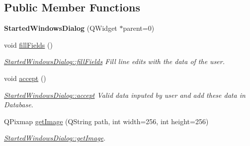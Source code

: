 \subsection*{Public Member Functions}
\begin{DoxyCompactItemize}
\item 
\hypertarget{classGui_1_1Dialogs_1_1StartedWindowsDialog_a978449729fbfc503919f29d1d2c7b4f6}{{\bfseries Started\-Windows\-Dialog} (Q\-Widget $\ast$parent=0)}\label{classGui_1_1Dialogs_1_1StartedWindowsDialog_a978449729fbfc503919f29d1d2c7b4f6}

\item 
\hypertarget{classGui_1_1Dialogs_1_1StartedWindowsDialog_a30d97171779c86ecc497ef6990829fca}{void \hyperlink{classGui_1_1Dialogs_1_1StartedWindowsDialog_a30d97171779c86ecc497ef6990829fca}{fill\-Fields} ()}\label{classGui_1_1Dialogs_1_1StartedWindowsDialog_a30d97171779c86ecc497ef6990829fca}

\begin{DoxyCompactList}\small\item\em \hyperlink{classGui_1_1Dialogs_1_1StartedWindowsDialog_a30d97171779c86ecc497ef6990829fca}{Started\-Windows\-Dialog\-::fill\-Fields} Fill line edits with the data of the user. \end{DoxyCompactList}\item 
\hypertarget{classGui_1_1Dialogs_1_1StartedWindowsDialog_aa5da70f656530017906b5aa974fbc080}{void \hyperlink{classGui_1_1Dialogs_1_1StartedWindowsDialog_aa5da70f656530017906b5aa974fbc080}{accept} ()}\label{classGui_1_1Dialogs_1_1StartedWindowsDialog_aa5da70f656530017906b5aa974fbc080}

\begin{DoxyCompactList}\small\item\em \hyperlink{classGui_1_1Dialogs_1_1StartedWindowsDialog_aa5da70f656530017906b5aa974fbc080}{Started\-Windows\-Dialog\-::accept} Valid data inputed by user and add these data in Database. \end{DoxyCompactList}\item 
Q\-Pixmap \hyperlink{classGui_1_1Dialogs_1_1StartedWindowsDialog_ae3e9ade2f5949d5fb57e06c54106609f}{get\-Image} (Q\-String path, int width=256, int height=256)
\begin{DoxyCompactList}\small\item\em \hyperlink{classGui_1_1Dialogs_1_1StartedWindowsDialog_ae3e9ade2f5949d5fb57e06c54106609f}{Started\-Windows\-Dialog\-::get\-Image}. \end{DoxyCompactList}\end{DoxyCompactItemize}


